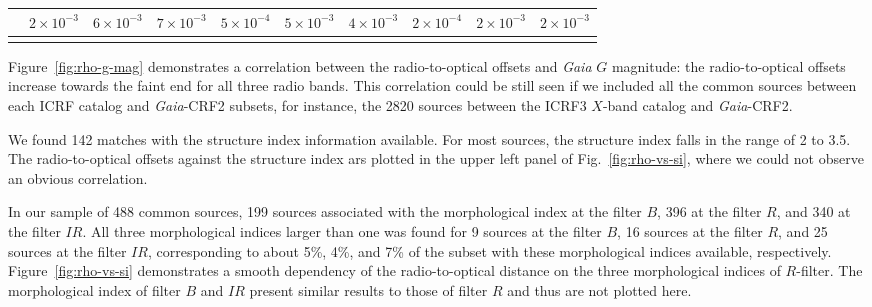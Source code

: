 \documentclass[referee]{aa}        %
\begin{document}
\begin{table}
\begin{tabular}{cccccccccc}
            &\textit{$2 \times 10^{-3}$}  &\textit{$6 \times 10^{-3}$}  &\textit{$7 \times 10^{-3}$}
            &\textit{$5 \times 10^{-4}$}  &\textit{$5 \times 10^{-3}$}  &\textit{$4 \times 10^{-3}$}
            &\textit{$2 \times 10^{-4}$}  &\textit{$2 \times 10^{-3}$}  &\textit{$2 \times 10^{-3}$}  \\
       \hline \noalign{\smallskip}
       \end{tabular}
   \end{table}

%
    Figure~\ref{fig:rho-g-mag} demonstrates a correlation between the radio-to-optical offsets and \textit{Gaia} $G$ magnitude: the radio-to-optical offsets increase towards the faint end for all three radio bands.
    This correlation could be still seen if we included all the common sources between each ICRF catalog and \textit{Gaia}-CRF2 subsets, for instance, the 2820 sources between the ICRF3 $X$-band catalog and \textit{Gaia}-CRF2.

    We found 142 matches with the structure index information available.
    For most sources, the structure index falls in the range of 2 to 3.5.
    The radio-to-optical offsets against the structure index ars plotted in the upper left panel of Fig.~\ref{fig:rho-vs-si}, where we could not observe an obvious correlation.

    In our sample of 488 common sources, 199 sources associated with the morphological index at the filter $B$, 396 at the filter $R$, and 340 at the filter $IR$.
    All three morphological indices larger than one was found for 9 sources at the filter $B$, 16 sources at the filter $R$, and 25 sources at the filter $IR$, corresponding to about 5\%, 4\%, and 7\% of the subset with these morphological indices available, respectively.
    Figure~\ref{fig:rho-vs-si} demonstrates a smooth dependency of the radio-to-optical distance on the three morphological indices of $R$-filter.
    The morphological index of filter $B$ and $IR$ present similar results to those of filter $R$ and thus are not plotted here.
\end{document}
